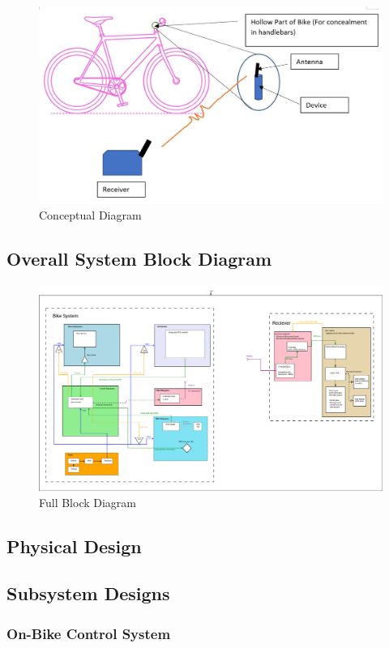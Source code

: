 \documentclass{article}
\begin{document}
\begin{figure}[H]
	\includegraphics[width=\textwidth]{visual_aid.JPG}
	\caption{Conceptual Diagram}
\end{figure}


\subsection{Overall System Block Diagram}
\begin{figure}[H]
	\includegraphics[width=\textwidth]{block_diagram_full.png}
	\caption{Full Block Diagram}
\end{figure}


\subsection{Physical Design}

\subsection{Subsystem Designs} 
\subsubsection{On-Bike Control System}
\end{document}
